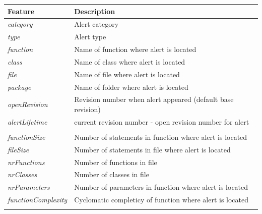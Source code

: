 \begin{table}[H]
	\centering
	\begin{tabular}{@{}ll@{}}
		\toprule
		\textbf{Feature}            & \textbf{Description}                                               \\ \midrule
		\textit{category}           & Alert category                                                     \\
		\textit{type}               & Alert type                                                         \\
		\textit{function}           & Name of function where alert is located                            \\
		\textit{class}              & Name of class where alert is located                               \\
		\textit{file}               & Name of file where alert is located                                \\
		\textit{package}            & Name of folder where alert is located                              \\
		\textit{openRevision}       & Revision number when alert appeared (default base revision)        \\
		\textit{alertLifetime}      & current revision number - open revision number for alert           \\
		\textit{}                   &                                                                    \\
		\textit{functionSize}       & Number of statements in function where alert is located            \\
		\textit{fileSize}           & Number of statements in file where alert is located                \\
		\textit{nrFunctions}        & Number of functions in file                                        \\
		\textit{nrClasses}          & Number of classes in file                                          \\
		\textit{nrParameters}       & Number of parameters in function where alert is located            \\
		\textit{functionComplexity} & Cyclomatic completicy of function where alert is located           \\
		\textit{}                   &                                                                    \\

\end{tabular}
\end{table}
